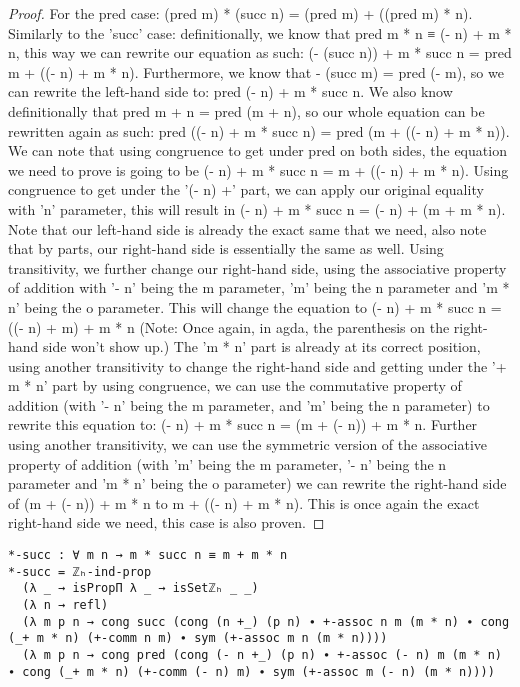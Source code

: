 \begin{proof}
  For the pred case: (pred m) * (succ n) = (pred m) + ((pred m) * n). Similarly to the 'succ' case: definitionally, we know that pred m * n ≡ (- n) + m * n, this way we can rewrite our equation as such: (- (succ n)) + m * succ n = pred m + ((- n) + m * n). Furthermore, we know that - (succ m) = pred (- m), so we can rewrite the left-hand side to: pred (- n) + m * succ n. We also know definitionally that pred m + n = pred (m + n), so our whole equation can be rewritten again as such: pred ((- n) + m * succ n) = pred (m + ((- n) + m * n)). We can note that using congruence to get under pred on both sides, the equation we need to prove is going to be (- n) + m * succ n = m + ((- n) + m * n). Using congruence to get under the '(- n) +' part, we can apply our original equality with 'n' parameter, this will result in (- n) + m * succ n = (- n) + (m + m * n). Note that our left-hand side is already the exact same that we need, also note that by parts, our right-hand side is essentially the same as well. Using transitivity, we further change our right-hand side, using the associative property of addition with '- n' being the m parameter, 'm' being the n parameter and 'm * n' being the o parameter. This will change the equation to (- n) + m * succ n = ((- n) + m) + m * n (Note: Once again, in agda, the parenthesis on the right-hand side won't show up.) The 'm * n' part is already at its correct position, using another transitivity to change the right-hand side and getting under the '+ m * n' part by using congruence, we can use the commutative property of addition (with '- n' being the m parameter, and 'm' being the n parameter) to rewrite this equation to: (- n) + m * succ n = (m + (- n)) + m * n. Further using another transitivity, we can use the symmetric version of the associative property of addition (with 'm' being the m parameter, '- n' being the n parameter and 'm * n' being the o parameter) we can rewrite the right-hand side of (m + (- n)) + m * n to m + ((- n) + m * n). This is once again the exact right-hand side we need, this case is also proven.
\end{proof}

\begin{listing}[H]
\begin{verbatim}
*-succ : ∀ m n → m * succ n ≡ m + m * n
*-succ = ℤₕ-ind-prop
  (λ _ → isPropΠ λ _ → isSetℤₕ _ _)
  (λ n → refl)
  (λ m p n → cong succ (cong (n +_) (p n) ∙ +-assoc n m (m * n) ∙ cong (_+ m * n) (+-comm n m) ∙ sym (+-assoc m n (m * n))))
  (λ m p n → cong pred (cong (- n +_) (p n) ∙ +-assoc (- n) m (m * n) ∙ cong (_+ m * n) (+-comm (- n) m) ∙ sym (+-assoc m (- n) (m * n))))
\end{verbatim}
\caption{Agda proof of succ being destructed by multiplication}
\end{listing}

